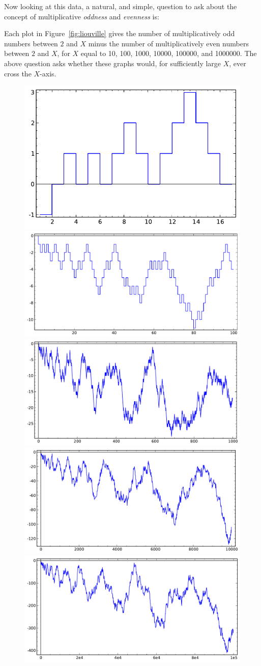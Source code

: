 \documentclass[openany]{book}
\theoremstyle{plain}
\theoremstyle{definition}
\begin{document}
   Now looking at this data, a natural, and simple, question to ask about the concept of multiplicative {\em oddness} and {\em evenness} is:


   Each plot in Figure~\ref{fig:liouville} gives the number of
   multiplicatively odd numbers between $2$ and $X$ minus the number
   of multiplicatively even numbers between $2$ and $X$, for $X$ equal
   to 10, 100, 1000, 10000, 100000, and 1000000. The above question
   asks whether these graphs would, for sufficiently large $X$, ever
   cross the $X$-axis.

 \begin{figure}[H]
\centering
\includegraphics[width=.4\textwidth]{illustrations/liouville-17}
\includegraphics[width=.4\textwidth]{illustrations/liouville-100}\\
\includegraphics[width=.4\textwidth]{illustrations/liouville-1000}
\includegraphics[width=.4\textwidth]{illustrations/liouville-10000}\\
\includegraphics[width=.4\textwidth]{illustrations/liouville-100000}

\end{figure}
\end{document}
